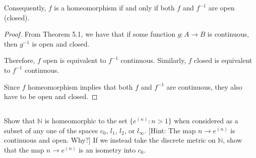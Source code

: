 Consequently, $f$ is a homeomorphism if and only if both $f$ and $f^{-1}$ are open (closed). 
    
\begin{proof}
From Theorem 5.1, we have that if some function $g: A \rightarrow B$ is continuous, then $g^{-1}$ is open and closed.

Therefore, $f$ open is equivalent to $f^{-1}$ continuous. Similarly, $f$ closed is equivalent to $f^{-1}$ continuous.

Since $f$ homeomorphism implies that both $f$ and $f^{-1}$ are continuous, they also have to be open and closed.
\end{proof}

    

\subsection{} Show that $\mathbb{N}$ is homeomorphic to the set $\{e^{(n)} : n > 1\}$ when considered as a subset of any one of the spaces $c_0$, $l_1$, $l_2$, or $l_\infty$. [Hint: The map $n \rightarrow e^{(n)}$ is continuous and open. Why?] If we instead take the discrete metric on $\mathbb{N}$, show that the map $n \rightarrow e^{(n)}$ is an isometry into $c_0$. 


